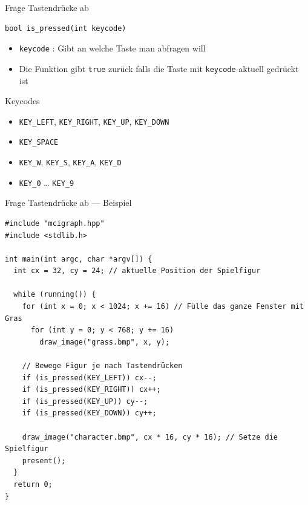 \documentclass[presentation]{beamer}
\begin{document}
\begin{frame}[label={sec:orgdfd4310},fragile]{Frage Tastendrücke ab}
 \begin{verbatim}
bool is_pressed(int keycode)
\end{verbatim}
\begin{itemize}
\item {\color{solarizedYellow}\texttt{keycode} }: Gibt an welche Taste man abfragen will
\item Die Funktion gibt {\color{solarizedYellow}\texttt{true} }zurück falls die Taste mit {\color{solarizedYellow}\texttt{keycode}}
aktuell gedrückt ist
\end{itemize}
\begin{block}{Keycodes}
\begin{itemize}
\item {\color{solarizedYellow}\texttt{KEY\_LEFT}}, {\color{solarizedYellow}\texttt{KEY\_RIGHT}}, {\color{solarizedYellow}\texttt{KEY\_UP}}, {\color{solarizedYellow}\texttt{KEY\_DOWN}}
\item {\color{solarizedYellow}\texttt{KEY\_SPACE}}
\item {\color{solarizedYellow}\texttt{KEY\_W}}, {\color{solarizedYellow}\texttt{KEY\_S}}, {\color{solarizedYellow}\texttt{KEY\_A}}, {\color{solarizedYellow}\texttt{KEY\_D}}
\item {\color{solarizedYellow}\texttt{KEY\_0} }\ldots{} {\color{solarizedYellow}\texttt{KEY\_9}}
\end{itemize}
\end{block}
\end{frame}
\begin{frame}[label={sec:org826c5dd},fragile]{Frage Tastendrücke ab --- Beispiel}
 \begin{verbatim}
#include "mcigraph.hpp"
#include <stdlib.h>

int main(int argc, char *argv[]) {
  int cx = 32, cy = 24; // aktuelle Position der Spielfigur

  while (running()) {
    for (int x = 0; x < 1024; x += 16) // Fülle das ganze Fenster mit Gras
      for (int y = 0; y < 768; y += 16)
        draw_image("grass.bmp", x, y);

    // Bewege Figur je nach Tastendrücken
    if (is_pressed(KEY_LEFT)) cx--;
    if (is_pressed(KEY_RIGHT)) cx++;
    if (is_pressed(KEY_UP)) cy--;
    if (is_pressed(KEY_DOWN)) cy++;

    draw_image("character.bmp", cx * 16, cy * 16); // Setze die Spielfigur
    present();
  }
  return 0;
}
\end{verbatim}
\end{frame}
\end{document}
